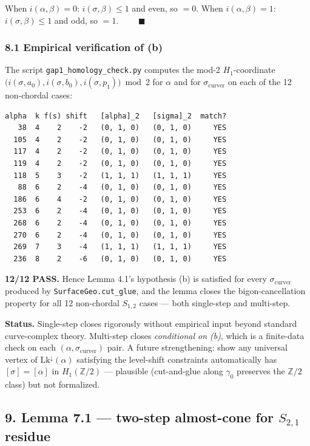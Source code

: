 \documentclass[
]{article}
\begin{document}
When \(i(\alpha, \beta) = 0\): \(i(\sigma, \beta) \le 1\) and even, so
\(= 0\). When \(i(\alpha, \beta) = 1\): \(i(\sigma, \beta) \le 1\) and
odd, so \(= 1\). \(\qquad\blacksquare\)

\subsubsection{8.1 Empirical verification of
(b)}\label{empirical-verification-of-b}

The script \texttt{gap1\_homology\_check.py} computes the mod-2
\(H_1\)-coordinate
\(\bigl(i(\sigma, a_0), i(\sigma, b_0), i(\sigma, p_1)\bigr) \bmod 2\)
for \(\alpha\) and for \(\sigma_\mathrm{curver}\) on each of the 12
non-chordal cases:

\begin{verbatim}
alpha  k f(s) shift   [alpha]_2   [sigma]_2  match?
   38  4    2    -2   (0, 1, 0)   (0, 1, 0)     YES
  105  4    2    -2   (0, 1, 0)   (0, 1, 0)     YES
  117  4    2    -2   (0, 1, 0)   (0, 1, 0)     YES
  119  4    2    -2   (0, 1, 0)   (0, 1, 0)     YES
  118  5    3    -2   (1, 1, 1)   (1, 1, 1)     YES
   88  6    2    -4   (0, 1, 0)   (0, 1, 0)     YES
  186  6    4    -2   (0, 1, 0)   (0, 1, 0)     YES
  253  6    2    -4   (0, 1, 0)   (0, 1, 0)     YES
  268  6    2    -4   (0, 1, 0)   (0, 1, 0)     YES
  270  6    2    -4   (0, 1, 0)   (0, 1, 0)     YES
  269  7    3    -4   (1, 1, 1)   (1, 1, 1)     YES
  236  8    2    -6   (0, 1, 0)   (0, 1, 0)     YES
\end{verbatim}

\textbf{12/12 PASS.} Hence Lemma 4.1's hypothesis (b) is satisfied for
every \(\sigma_\mathrm{curver}\) produced by
\texttt{SurfaceGeo.cut\_glue}, and the lemma closes the
bigon-cancellation property for all 12 non-chordal \(S_{1,2}\) cases ---
both single-step and multi-step.

\textbf{Status.} Single-step closes rigorously without empirical input
beyond standard curve-complex theory. Multi-step closes
\emph{conditional on (b)}, which is a finite-data check on each
\((\alpha, \sigma_\mathrm{curver})\) pair. A future strengthening: show
any universal vertex of \(\mathrm{Lk}^\downarrow(\alpha)\) satisfying
the level-shift constraints automatically has \([\sigma] = [\alpha]\) in
\(H_1(\mathbb Z/2)\) --- plausible (cut-and-glue along \(\gamma_0\)
preserves the \(\mathbb Z/2\) class) but not formalized.

\subsection{\texorpdfstring{9. Lemma 7.1 --- two-step almost-cone for
\(S_{2,1}\)
residue}{9. Lemma 7.1 --- two-step almost-cone for S\_\{2,1\} residue}}\label{lemma-7.1-two-step-almost-cone-for-s_21-residue}
\end{document}
